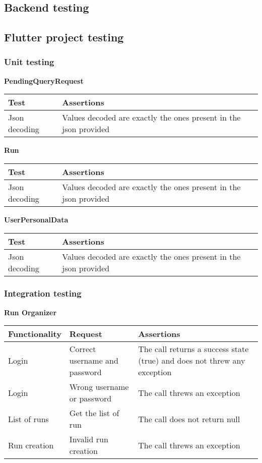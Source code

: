 \subsection{Backend testing}








\subsection{Flutter project testing}
\subsubsection{Unit testing}


\noindent\textbf{PendingQueryRequest} 

\begin{longtable}[htb]{|p{}|p{}|}
    \hline
    \textbf{Test} & \textbf{Assertions} \\
    \hline
    Json decoding & Values decoded are exactly the ones present in the json provided\\
    \hline
\end{longtable}

\noindent\textbf{Run}
\begin{longtable}{|p{}|p{}|}
    \hline
    \textbf{Test} & \textbf{Assertions} \\
    \hline
    Json decoding & Values decoded are exactly the ones present in the json provided\\
    \hline
\end{longtable}

\noindent\textbf{UserPersonalData}
\begin{longtable}{|p{}|p{}|}
    \hline
    \textbf{Test} & \textbf{Assertions} \\
    \hline
    Json decoding & Values decoded are exactly the ones present in the json provided\\
    \hline
\end{longtable}

\subsubsection{Integration testing}
\noindent\textbf{Run Organizer}
\begin{longtable}{|p{}|p{}|p{}|}
    \hline
    \textbf{Functionality} & \textbf{Request} & \textbf{Assertions} \\
    \hline
    Login & Correct username and password & The call returns a success state (true) and does not threw any exception\\
    \hline
    Login & Wrong username or password & The call threws an exception\\
    \hline
    List of runs & Get the list of run & The call does not return null\\
    \hline
    Run creation & Invalid run creation & The call threws an exception\\
    \hline
    
\end{longtable}

